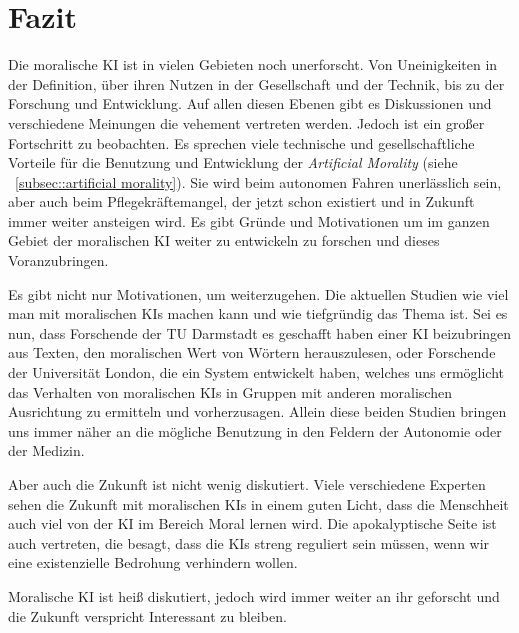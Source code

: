 \section{Fazit}\label{sec::fazit}

Die moralische KI ist in vielen Gebieten noch unerforscht.
Von Uneinigkeiten in der Definition, über ihren Nutzen in der Gesellschaft und der Technik, bis zu der
Forschung und Entwicklung.
Auf allen diesen Ebenen gibt es Diskussionen und verschiedene Meinungen die vehement vertreten werden.
Jedoch ist ein großer Fortschritt zu beobachten.
Es sprechen viele technische und gesellschaftliche Vorteile für die Benutzung und Entwicklung der
\textit{Artificial Morality} (siehe ~\ref{subsec::artificial morality}).
Sie wird beim autonomen Fahren unerlässlich sein, aber auch beim Pflegekräftemangel, der jetzt schon
existiert und in Zukunft immer weiter ansteigen wird.
Es gibt Gründe und Motivationen um im ganzen Gebiet der moralischen KI weiter zu entwickeln zu forschen und dieses
Voranzubringen.

Es gibt nicht nur Motivationen, um weiterzugehen.
Die aktuellen Studien wie viel man mit moralischen KIs machen kann und wie tiefgründig das Thema ist.
Sei es nun, dass Forschende der TU Darmstadt es geschafft haben einer KI beizubringen aus Texten, den moralischen
Wert von Wörtern herauszulesen, oder Forschende der Universität London, die ein System entwickelt haben, welches uns
ermöglicht das Verhalten von moralischen KIs in Gruppen mit anderen moralischen Ausrichtung zu ermitteln und vorherzusagen.
Allein diese beiden Studien bringen uns immer näher an die mögliche Benutzung in den Feldern der Autonomie oder der Medizin.

Aber auch die Zukunft ist nicht wenig diskutiert.
Viele verschiedene Experten sehen die Zukunft mit moralischen KIs in einem guten Licht, dass die Menschheit
auch viel von der KI im Bereich Moral lernen wird.
Die apokalyptische Seite ist auch vertreten, die besagt, dass die KIs streng reguliert sein müssen, wenn wir eine
existenzielle Bedrohung verhindern wollen.

Moralische KI ist heiß diskutiert, jedoch wird immer weiter an ihr geforscht und die Zukunft verspricht
Interessant zu bleiben.